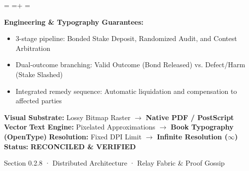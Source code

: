 \documentclass[10pt,a4paper,landscape]{article}
\newcommand{\pdautoscale}[2]{%
  \pdmaxh=#1\relax
  \pdmaxw=#2\relax
  \sbox{\pdscaledbox}{\usebox{\pdfigbox}}%
  \pdcurh=\dimexpr\ht\pdscaledbox+\dp\pdscaledbox\relax
  \pdcurw=\wd\pdscaledbox
  \ifdim\dimexpr\pdcurw * 100 / \pdmaxw\relax > \dimexpr\pdcurh * 100 / \pdmaxh\relax
    \resizebox{\pdmaxw}{!}{\usebox{\pdscaledbox}}%
  \else
    \resizebox{!}{\pdmaxh}{\usebox{\pdscaledbox}}%
  \fi
}
\begin{document}
\begin{minipage}[t]{0.492\linewidth}
  \begin{tcolorbox}[
    colback=pdcobalt!3,colframe=pdcobalt!85!black,arc=1.5pt,
    boxrule=0.7pt,top=1.5pt,bottom=1.5pt,left=4pt,right=4pt,
    title={\pdgrotesk\footnotesize\bfseries \color{white} B. Authoritative Native Vector Replacement \hfill \texttt{.tex / TikZ / PGF}}
  ]
    \begin{minipage}[c][8.3cm][c]{\linewidth}
      \centering
      \sbox{\pdfigbox}{}
      \pdautoscale{8.0cm}{\linewidth}
    \end{minipage}
    \tcblower
    \begin{minipage}[t][2.0cm][t]{\linewidth}
      \pdgrotesk\scriptsize
      \textbf{{\color{pdcobalt} Engineering \& Typography Guarantees:}}\\
      \begin{itemize}[leftmargin=9pt,itemsep=0pt,topsep=0.5pt,parsep=0pt]
        \item 3-stage pipeline: Bonded Stake Deposit, Randomized Audit, and Contest Arbitration
        \item Dual-outcome branching: Valid Outcome (Bond Released) vs. Defect/Harm (Stake Slashed)
        \item Integrated remedy sequence: Automatic liquidation and compensation to affected parties
      \end{itemize}
    \end{minipage}
  \end{tcolorbox}
\end{minipage}

\vspace*{0.05cm}
\noindent
\begin{tcolorbox}[
  colback=hhpaper,colframe=hhgray!35,arc=1.5pt,boxrule=0.4pt,
  top=1.5pt,bottom=1.5pt,left=6pt,right=6pt
]
  \pdgrotesk\scriptsize
  \noindent
  \textbf{Visual Substrate:} Lossy Bitmap Raster $\rightarrow$ \textbf{\color{pdcobalt}Native PDF / PostScript Vector}\hfill
  \textbf{Text Engine:} Pixelated Approximations $\rightarrow$ \textbf{\color{pdcobalt}Book Typography (OpenType)}\hfill
  \textbf{Resolution:} Fixed DPI Limit $\rightarrow$ \textbf{\color{pdcobalt}Infinite Resolution ($\infty$)}\hfill
  \textbf{Status:} \textbf{\color{pdteal}RECONCILED \& VERIFIED}
\end{tcolorbox}
\clearpage

\noindent
\begin{minipage}[t]{\linewidth}
  \hfill
  {\pdgrotesk\footnotesize\color{hhgray} Section 0.2.8 · Distributed Architecture · Relay Fabric \& Proof Gossip}\\
  \vspace*{0.03cm}
  \noindent{\color{hhgray!40}\rule{\linewidth}{0.5pt}}
\end{minipage}
\end{document}
